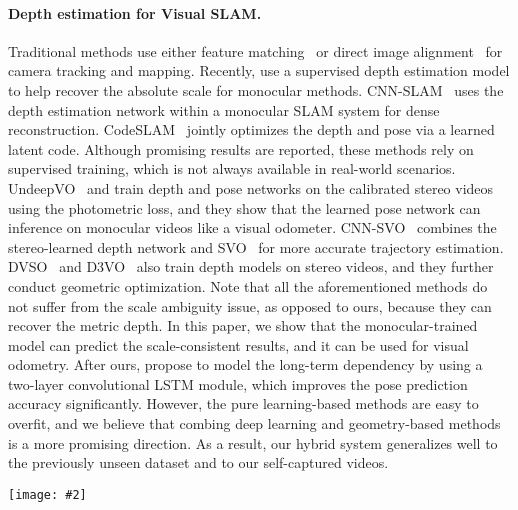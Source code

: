 \documentclass[twocolumn]{svjour3}
\renewcommand{\cite}[1]{\textcolor{blue}{\citep{#1}}}
\def\ie{\emph{i.e.}}
\newcommand{\figref}[1]{Fig.~\ref{#1}}
\newcommand{\equref}[1]{Eqn.~\ref{#1}}
\newcommand{\addImg}[2][0.495]{\texttt{[image: \#2]}}
\begin{document}
\paragraph{Depth estimation for Visual SLAM.}
Traditional methods use either feature matching~\cite{Geiger2011IV,klein2007parallel} or direct image alignment~\cite{forster2014svo, engel2017direct} for camera tracking and mapping. 
Recently, \cite{yin2017scale} use a supervised depth estimation model to help recover the absolute scale for monocular methods.
CNN-SLAM~\cite{tateno2017cnn} uses the depth estimation network within a monocular SLAM system for dense reconstruction.
CodeSLAM~\cite{bloesch2018codeslam} jointly optimizes the depth and pose via a learned latent code.
Although promising results are reported,
these methods rely on supervised training,
which is not always available in real-world scenarios.
UndeepVO~\cite{li2018undeepvo} and \cite{zhan2018unsupervised} train depth and pose networks on the calibrated stereo videos using the photometric loss,
and they show that the learned pose network can inference on monocular videos like a visual odometer.
CNN-SVO~\cite{loo2019cnn} combines the stereo-learned depth network and SVO~\cite{forster2014svo} for more accurate trajectory estimation. 
DVSO~\cite{yang2018deep} and D3VO~\cite{yang2020d3vo} also train depth models on stereo videos,
and they further conduct geometric optimization.
Note that all the aforementioned methods do not suffer from the scale ambiguity issue, as opposed to ours,
because they can recover the metric depth.
In this paper, we show that the monocular-trained model can predict the scale-consistent results,
and it can be used for visual odometry.
After ours, \cite{zou2020learning} propose to model the long-term dependency by using a two-layer convolutional LSTM module,
which improves the pose prediction accuracy significantly.
However, the pure learning-based methods are easy to overfit,
and we believe that combing deep learning and geometry-based methods is a more promising direction.
As a result, our hybrid system generalizes well to the previously unseen dataset and to our self-captured videos.




\begin{figure*}[ht]
  \centering
  \addImg[1]{images/sc-figure.pdf}
  \caption{Illustration of the proposed geometry consistency loss and self-discover mask.
    Given two consecutive frames (, ), 
    we first estimate their depth maps (, ) and relative pose () using the network.
    Then we compute the  (\equref{eqn-depthdiff}), \ie, pixel-wise depth inconsistency between  and .
    Finally, we derive our geometric consistency loss  (\equref{eqn-gc}) and self-discovered mask  (\equref{eqn-mask})
    from  to regularize the network training and hanlding dynamics and occlusions (\figref{fig:show}).
    For clarity, the photometric loss and smoothness loss are not shown in 
    this figure.}
    \label{fig:sc-framework}
\end{figure*}
\end{document}
